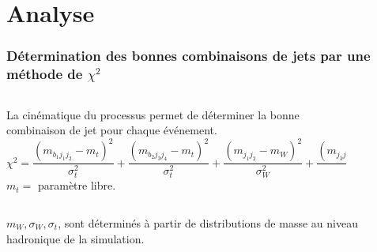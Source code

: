 \documentclass[usepdftitle=false,green]{beamer}
\newcommand{\nologo}{\setbeamertemplate{logo}{}} %
\begin{document}
\section{Analyse}
{\nologo  
\begin{frame}
	\frametitle{Détermination des bonnes combinaisons de jets par une méthode de $\chi^2$}
	\vspace{-5ex}
	\begin{columns}
	\vspace{15ex}
		\begin{column}{8.5cm}
			La cinématique du processus permet de déterminer la bonne combinaison de jet pour chaque événement.
			{\scriptsize
			\begin{equation*}
				\chi^2 = \frac{ (m_{b_1j_1j_2}-m_t)^2 }{ \sigma_t^2 } + \frac{
		(m_{b_2j_3j_4}-m_t)^2 }{ \sigma_t^2 } + \frac{ (m_{j_1j_2}-m_W)^2 }{
		\sigma_W^2 } + \frac{ (m_{j_3j_4}-m_W)^2 }{ \sigma_W^2 }
			\end{equation*}
			\vspace{-7ex}
			$m_t = $ paramètre libre.
			}
		\end{column}
		\begin{column}{3cm}
			\vspace{1ex}
			\begin{figure}
			\end{figure}
		\end{column}
	\end{columns}
	\vspace{3ex}
	\begin{columns}
		\begin{column}{6.2cm}
		\end{column}
		\begin{column}{6.2cm}
		\end{column}
	\end{columns}
	$m_W, \sigma_W, \sigma_t$, sont déterminés à partir de distributions de masse au niveau hadronique de la simulation.
\end{frame}
}
\end{document}
